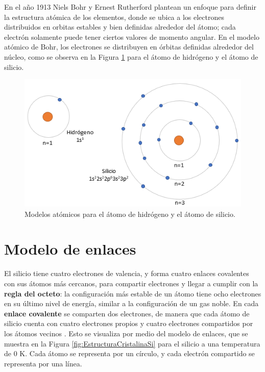 En el año 1913 Niels Bohr y Ernest Rutherford plantean un enfoque para definir la estructura atómica de los elementos, donde se ubica a los electrones distribuidos en orbitas estables y bien definidas alrededor del átomo; cada electrón solamente puede tener ciertos valores de momento angular. En el modelo atómico de Bohr, los electrones se distribuyen en órbitas definidas alrededor del núcleo, como se observa en la Figura \ref{modelo_bohr} para el átomo de hidrógeno y el átomo de silicio. 

\begin{figure}[H]
    \centering
    \includegraphics{figuras/modelo_bohr.png}
    \caption{Modelos atómicos para el átomo de hidrógeno y el átomo de silicio.}
    \label{modelo_bohr}
\end{figure}


\section{Modelo de enlaces}

El silicio tiene cuatro electrones de valencia, y forma cuatro enlaces covalentes con sus átomos más cercanos, para compartir electrones y llegar a cumplir con la \textbf{regla del octeto}: la configuración más estable de un átomo tiene ocho electrones en su último nivel de energía, similar a la configuración de un gas noble. En cada \textbf{enlace covalente} se comparten dos electrones, de manera que cada átomo de silicio cuenta con cuatro electrones propios y cuatro electrones compartidos por los átomos vecinos \cite{b1}. Esto se visualiza por medio del modelo de enlaces, que se muestra en la Figura \ref{fig:EstructuraCristalinaSi} para el silicio a una temperatura de 0 K. Cada átomo se representa por un círculo, y cada electrón compartido se representa por una línea. 

